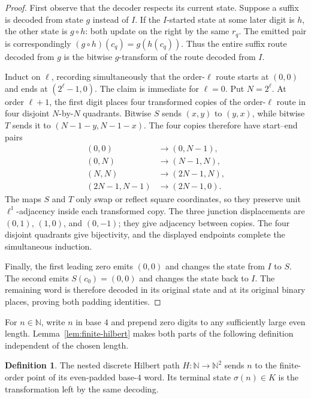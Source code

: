 \documentclass[11pt]{article}
\theoremstyle{definition}
\newtheorem{definition}[theorem]{Definition}
\theoremstyle{remark}
\newcommand{\N}{\mathbb N}
\begin{document}
\begin{proof}
First observe that the decoder respects its current state.  Suppose a suffix
is decoded from state $g$ instead of $I$.  If the $I$-started state at some
later digit is $h$, the other state is $g\circ h$: both update on the right by
the same $r_q$.  The emitted pair is correspondingly
$(g\circ h)(c_q)=g(h(c_q))$.  Thus the entire suffix route decoded from $g$ is
the bitwise $g$-transform of the route decoded from $I$.

Induct on $\ell$, recording simultaneously that the order-$\ell$ route starts
at $(0,0)$ and ends at $(2^\ell-1,0)$.  The claim is immediate for $\ell=0$.
Put $N=2^\ell$.  At order $\ell+1$, the first digit places four transformed
copies of the order-$\ell$ route in four disjoint $N$-by-$N$ quadrants.
Bitwise $S$ sends $(x,y)$ to $(y,x)$, while bitwise $T$ sends it to
$(N-1-y,N-1-x)$.  The four copies therefore have start--end pairs
\[
\begin{aligned}
 (0,0)&\longrightarrow(0,N-1),\\
 (0,N)&\longrightarrow(N-1,N),\\
 (N,N)&\longrightarrow(2N-1,N),\\
 (2N-1,N-1)&\longrightarrow(2N-1,0).
\end{aligned}
\]
The maps $S$ and $T$ only swap or reflect square coordinates, so they preserve
unit $\ell^1$-adjacency inside each transformed copy.  The three junction
displacements are $(0,1)$, $(1,0)$, and $(0,-1)$; they give adjacency between
copies.  The four disjoint quadrants give bijectivity, and the displayed
endpoints complete the simultaneous induction.

Finally, the first leading zero emits $(0,0)$ and changes the state from $I$
to $S$.  The second emits $S(c_0)=(0,0)$ and changes the state back to $I$.
The remaining word is therefore decoded in its original state and at its
original binary places, proving both padding identities.
\end{proof}

For $n\in\N$, write $n$ in base $4$ and prepend zero digits to any sufficiently
large even length.  Lemma~\ref{lem:finite-hilbert} makes both parts of the
following definition independent of the chosen length.

\begin{definition}\label{def:H}
The nested discrete Hilbert path $H\colon\N\to\N^2$ sends $n$ to the
finite-order point of its even-padded base-$4$ word.  Its terminal state
$\sigma(n)\in K$ is the transformation left by the same decoding.
\end{definition}
\end{document}
